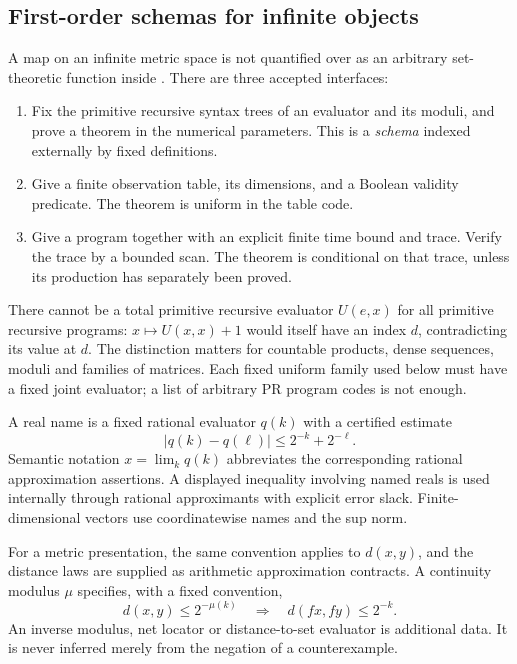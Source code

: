 \subsection{First-order schemas for infinite objects}

A map on an infinite metric space is not quantified over as an arbitrary set-theoretic function inside \ipra. There are three accepted interfaces:
\begin{enumerate}
\item Fix the primitive recursive syntax trees of an evaluator and its moduli, and prove a theorem in the numerical parameters. This is a \emph{schema} indexed externally by fixed definitions.
\item Give a finite observation table, its dimensions, and a Boolean validity predicate. The theorem is uniform in the table code.
\item Give a program together with an explicit finite time bound and trace. Verify the trace by a bounded scan. The theorem is conditional on that trace, unless its production has separately been proved.
\end{enumerate}

There cannot be a total primitive recursive evaluator $U(e,x)$ for all primitive recursive programs: $x\mapsto U(x,x)+1$ would itself have an index $d$, contradicting its value at $d$. The distinction matters for countable products, dense sequences, moduli and families of matrices. Each fixed uniform family used below must have a fixed joint evaluator; a list of arbitrary PR program codes is not enough.

\begin{definition}
A real name is a fixed rational evaluator $q(k)$ with a certified estimate
\[
 |q(k)-q(\ell)|\leq 2^{-k}+2^{-\ell}.
\]
Semantic notation $x=\lim_kq(k)$ abbreviates the corresponding rational approximation assertions. A displayed inequality involving named reals is used internally through rational approximants with explicit error slack. Finite-dimensional vectors use coordinatewise names and the sup norm.
\end{definition}

For a metric presentation, the same convention applies to $d(x,y)$, and the distance laws are supplied as arithmetic approximation contracts. A continuity modulus $\mu$ specifies, with a fixed convention,
\[
 d(x,y)\leq2^{-\mu(k)}
   \quad\Longrightarrow\quad d(fx,fy)\leq2^{-k}.
\]
An inverse modulus, net locator or distance-to-set evaluator is additional data. It is never inferred merely from the negation of a counterexample.

